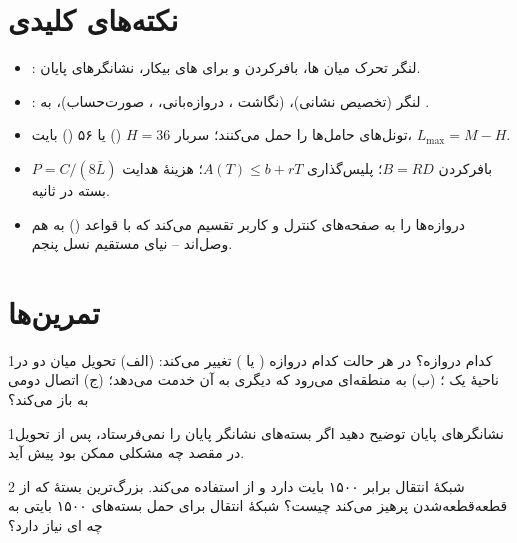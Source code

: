 \documentclass[11pt,a4paper]{article}
\begin{document}
\section{نکته‌های کلیدی}
\begin{takeawaybox}
\begin{itemize}
  \item {}: لنگر تحرک میان ها، بافرکردن و  برای های بیکار، نشانگرهای پایان.
  \item {}: لنگر  (تخصیص نشانی)،  (نگاشت ، دروازه‌بانی، ، صورت‌حساب)، 
        به .
  \item تونل‌های  حامل‌ها را حمل می‌کنند؛ سربار $H = 36$ () یا ۵۶ () بایت، $L_{\max} = M - H$.
  \item بافرکردن $B = RD$؛ پلیس‌گذاری $A(T) \le b + rT$؛ هزینهٔ هدایت $P = C/(8\bar L)$ بسته در ثانیه.
  \item {} دروازه‌ها را به صفحه‌های کنترل و کاربر تقسیم می‌کند که با قواعد  ()
        به هم وصل‌اند -- نیای مستقیم  نسل پنجم.
\end{itemize}
\end{takeawaybox}

\section{تمرین‌ها}

\begin{exercisebox}{1}{کدام دروازه؟}\label{exr:roles}
در هر حالت کدام دروازه ( یا ) تغییر می‌کند: (الف) تحویل  میان دو  در ناحیهٔ یک ؛
(ب)  به منطقه‌ای می‌رود که  دیگری به آن خدمت می‌دهد؛ (ج)  اتصال  دومی به 
 باز می‌کند؟
\end{exercisebox}

\begin{exercisebox}{1}{نشانگرهای پایان}\label{exr:endmarker}
توضیح دهید اگر  بسته‌های نشانگر پایان را نمی‌فرستاد، پس از تحویل در  مقصد چه مشکلی ممکن بود پیش آید.
\end{exercisebox}

\begin{exercisebox}{2}{}\label{exr:mtu}
شبکهٔ انتقال  برابر ۱۵۰۰ بایت دارد و از  استفاده می‌کند. بزرگ‌ترین بستهٔ  که از قطعه‌قطعه‌شدن
پرهیز می‌کند چیست؟ شبکهٔ انتقال برای حمل بسته‌های ۱۵۰۰ بایتی  به چه ای نیاز دارد؟
\end{exercisebox}
\end{document}
